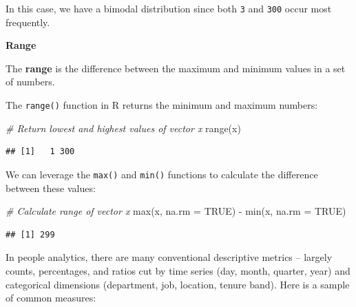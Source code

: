 \documentclass[
]{book}
\newenvironment{Shaded}{\begin{snugshade}}{\end{snugshade}}
\newcommand{\AttributeTok}[1]{\textcolor[rgb]{0.77,0.63,0.00}{#1}}
\newcommand{\CommentTok}[1]{\textcolor[rgb]{0.56,0.35,0.01}{\textit{#1}}}
\newcommand{\ConstantTok}[1]{\textcolor[rgb]{0.00,0.00,0.00}{#1}}
\newcommand{\FunctionTok}[1]{\textcolor[rgb]{0.00,0.00,0.00}{#1}}
\newcommand{\NormalTok}[1]{#1}
\newcommand{\SpecialCharTok}[1]{\textcolor[rgb]{0.00,0.00,0.00}{#1}}
\begin{document}
In this case, we have a bimodal distribution since both \texttt{3} and \texttt{300} occur most frequently.

\textbf{Range}

The \textbf{range} is the difference between the maximum and minimum values in a set of numbers.

The \texttt{range()} function in R returns the minimum and maximum numbers:

\begin{Shaded}
\begin{Highlighting}[]
\CommentTok{\# Return lowest and highest values of vector x}
\FunctionTok{range}\NormalTok{(x)}
\end{Highlighting}
\end{Shaded}

\begin{verbatim}
## [1]   1 300
\end{verbatim}

We can leverage the \texttt{max()} and \texttt{min()} functions to calculate the difference between these values:

\begin{Shaded}
\begin{Highlighting}[]
\CommentTok{\# Calculate range of vector x}
\FunctionTok{max}\NormalTok{(x, }\AttributeTok{na.rm =} \ConstantTok{TRUE}\NormalTok{) }\SpecialCharTok{{-}} \FunctionTok{min}\NormalTok{(x, }\AttributeTok{na.rm =} \ConstantTok{TRUE}\NormalTok{)}
\end{Highlighting}
\end{Shaded}

\begin{verbatim}
## [1] 299
\end{verbatim}

In people analytics, there are many conventional descriptive metrics -- largely counts, percentages, and ratios cut by time series (day, month, quarter, year) and categorical dimensions (department, job, location, tenure band). Here is a sample of common measures:
\end{document}

